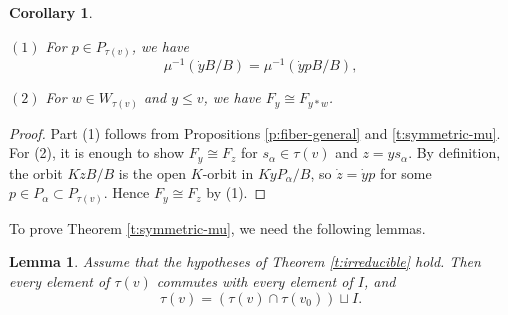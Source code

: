 \documentclass[11pt,letterpaper,reqno]{amsart}
\newcommand{\ga}{\alpha}
\numberwithin{equation}{section}
\theoremstyle{plain}
\newtheorem{corollary}[theorem]{Corollary}
\newtheorem{lemma}[theorem]{Lemma}
\theoremstyle{definition}
\theoremstyle{remark}
\begin{document}
\begin{corollary} \label{c:symmetric-mu}

$(1)$ For $p \in P_{\tau(v)}$, we have 
\begin{equation} \label{e:isom}
\mu^{-1}(\dot{y}B/B) = \mu^{-1}(\dot{y} p B/B),
\end{equation}

$(2)$ For $w \in W_{\tau(v)}$ and $y \leq v$, we have $F_y \cong F_{y * w}$.
\end{corollary}

\begin{proof}
 Part (1) follows from Propositions
\ref{p:fiber-general} and \ref{t:symmetric-mu}.  For (2), it is enough to show
$F_y \cong F_{z}$ for $s_{\alpha} \in \tau(v)$ and $z = y s_{\alpha} $.  By definition,
the orbit $K \dot{z} B/B$ is the open $K$-orbit in $K \dot{y} P_{\ga}/B$, so
$\dot{z} = \dot{y} p$ for some $p \in P_{\ga} \subset P_{\tau(v)}$.  Hence 
$F_y \cong F_z$ by (1).
\end{proof}


To prove Theorem \ref{t:symmetric-mu}, we need the following lemmas.

\begin{lemma} \label{l:tau}
Assume that the hypotheses of Theorem \ref{t:irreducible}  hold.  Then 
every element of $\tau(v)$
commutes with every element of $I$, and
\begin{equation} \label{e:tau}
\tau(v) = (\tau(v) \cap \tau(v_0)) \sqcup I.
\end{equation}
\end{lemma}
\end{document}
